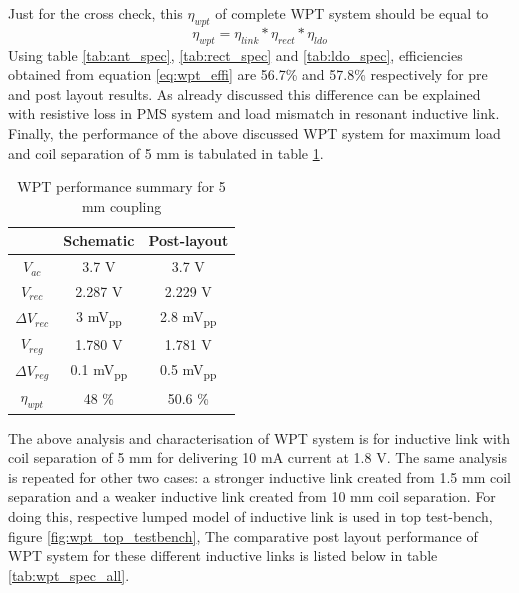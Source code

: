 \documentclass[12pt,a4paper,UKenglish]{report}
\begin{document}
Just for the cross check, this $\eta_{wpt}$ of complete WPT system should be equal to 
\begin{equation} \label{eq:wpt_effi} 
\eta_{wpt} = \eta_{link}*\eta_{rect}*\eta_{ldo}
\end{equation}
Using table \ref{tab:ant_spec}, \ref{tab:rect_spec} and \ref{tab:ldo_spec}, efficiencies obtained from equation \ref{eq:wpt_effi} 
are 56.7\% and 57.8\% respectively for pre and post layout results. As already discussed this difference can be explained with resistive loss
 in PMS system and load mismatch in resonant inductive link.\\

Finally, the performance of the above discussed WPT system for maximum load and coil separation of 5 mm is tabulated in 
table \ref{tab:wpt_spec}. 


\begin{table}[H]
\caption{WPT performance summary for 5 mm coupling} 
\begin{center}
\begin{tabular}{c|c|c}
\hline \hline
					& \textbf{Schematic}	& \textbf{Post-layout} 	\\
\hline \hline
$V_{ac}$			& 3.7 \si{\volt}		& 3.7 \si{\volt} \\ \hline
$V_{rec}$ 			& 2.287 \si{\volt}		& 2.229 V	\\ \hline
$\Delta V_{rec}$	& 3 \si{\milli\volt}\textsubscript{pp} & 2.8 \si{\milli\volt}\textsubscript{pp}		\\ \hline
$V_{reg}$			& 1.780	\si{\volt}		& 1.781 \si{\volt}			\\ \hline
$\Delta V_{reg}$ 	& 0.1 \si{\milli\volt}\textsubscript{pp} & 0.5 \si{\milli\volt}\textsubscript{pp}		\\ \hline
$\eta_{wpt}$		& 48 \%				& 50.6 \%		\\ 
 
\hline \hline
\end{tabular}
\end{center}
\label{tab:wpt_spec}
\end{table}%

The above analysis and characterisation of WPT system is for inductive link with coil separation of 5 mm for delivering 10 mA current at 1.8 V. The 
same analysis is repeated for other two cases: a stronger inductive link created from 1.5 mm coil separation and a weaker inductive link 
created from 10 mm coil separation. For doing this, respective lumped model of inductive link is used in top test-bench, 
figure \ref{fig:wpt_top_testbench}, The comparative post layout performance of WPT system for these different inductive links is listed below in 
table \ref{tab:wpt_spec_all}.
\end{document}

